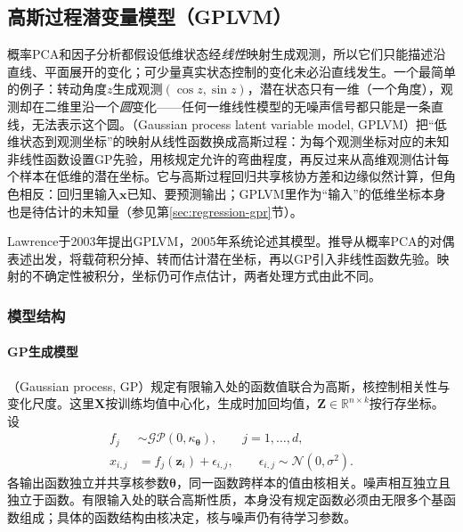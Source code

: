 \subsection{高斯过程潜变量模型（GPLVM）}
\label{sec:dim-gplvm}

概率PCA和因子分析都假设低维状态经\emph{线性}映射生成观测，所以它们只能描述沿直线、平面展开的变化；可少量真实状态控制的变化未必沿直线发生。一个最简单的例子：转动角度$z$生成观测$(\cos z,\sin z)$，潜在状态只有一维（一个角度），观测却在二维里沿一个\emph{圆}变化——任何一维线性模型的无噪声信号都只能是一条直线，无法表示这个圆。（Gaussian process latent variable model, GPLVM）把“低维状态到观测坐标”的映射从线性函数换成高斯过程：为每个观测坐标对应的未知非线性函数设置GP先验，用核规定允许的弯曲程度，再反过来从高维观测估计每个样本在低维的潜在坐标。它与高斯过程回归共享核协方差和边缘似然计算，但角色相反：回归里输入$\bm x$已知、要预测输出；GPLVM里作为“输入”的低维坐标本身也是待估计的未知量（参见第\ref{sec:regression-gpr}节）。

Lawrence于2003年提出GPLVM，2005年系统论述其模型。推导从概率PCA的对偶表述出发，将载荷积分掉、转而估计潜在坐标，再以GP引入非线性函数先验。映射的不确定性被积分，坐标仍可作点估计，两者处理方式由此不同。

\subsubsection{模型结构}
\label{sec:dim-gplvm-structure}

\paragraph{GP生成模型}

（Gaussian process, GP）规定有限输入处的函数值联合为高斯，核控制相关性与变化尺度。这里$\bm{X}$按训练均值中心化，生成时加回均值，$\bm{Z}\in\mathbb{R}^{n\times k}$按行存坐标。设
\begin{equation}
\label{eq:dim-gplvm-generative}
\begin{aligned}
f_j&\sim\mathcal{GP}(0,\kappa_{\bm{\theta}}),
\qquad j=1,\ldots,d,\\
x_{i,j}&=f_j(\bm{z}_i)+\epsilon_{i,j},
\qquad \epsilon_{i,j}\sim\mathcal{N}(0,\sigma^2).
\end{aligned}
\end{equation}
各输出函数独立并共享核参数$\bm{\theta}$，同一函数跨样本的值由核相关。噪声相互独立且独立于函数。有限输入处的联合高斯性质，本身没有规定函数必须由无限多个基函数组成；具体的函数结构由核决定，核与噪声仍有待学习参数。

